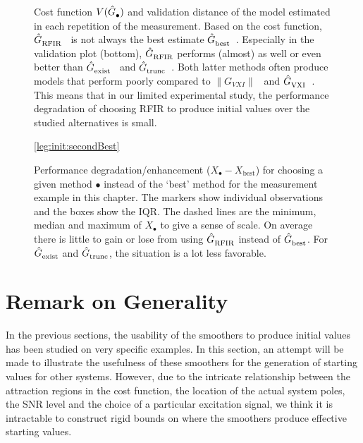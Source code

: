 \begin{figure}
  \centering
  \setlength{\figurewidth}{0.85\columnwidth}
  \setlength{\figureheight}{0.68\figurewidth}
  
  \caption[$\costFunc{\bullet}$ and $\validationDistance{\bullet}$ for each repeated measurement.]{Cost function $V(\hat{G}_{\mathrm{\bullet}}^{\mathrm{}})$ and validation distance of the model estimated in each repetition of the measurement.
  Based on the cost function, $\hat{G}_{\mathrm{RFIR}}^{\mathrm{}}$~ is not always the best estimate $\hat{G}_{\mathrm{best}}^{\mathrm{}}$~.
  Especially in the validation plot (bottom), $\hat{G}_{\mathrm{RFIR}}^{\mathrm{}}$ performs (almost) as well or even better than $\hat{G}_{\mathrm{exist}}^{\mathrm{}}$~ and $\hat{G}_{\mathrm{trunc}}^{\mathrm{}}$~.
  Both latter methods often produce models that perform poorly compared to $\| G_{VXI} \|$~ and $\hat{G}_{\mathrm{VXI}}^{\mathrm{}}$~.
  This means that in our limited experimental study, the performance degradation of choosing RFIR to produce initial values over the studied alternatives is small.}
  \label{fig:overview}
\end{figure}

\begin{figure}
  \centering
  \ref{leg:init:secondBest}
  \setlength{\figurewidth}{0.75\columnwidth}
  \setlength{\figureheight}{0.60\figurewidth}
  
  \caption[Performance degradation/enhancement for selecting the second best model.]{
  Performance degradation/enhancement ($X_{\bullet}-X_{\mathrm{best}}$) for choosing a given method $\bullet$ instead of the `best' method for the measurement example in this chapter.
  The markers show individual observations and the boxes show the \gls{IQR}.
  The dashed lines are the minimum, median and maximum of $X_{\bullet}$ to give a sense of scale.
  On average there is little to gain or lose from using $\hat{G}_{\mathrm{RFIR}}^{\mathrm{}}$ instead of $\hat{G}_{\mathrm{best}}^{\mathrm{}}$.
  For $\hat{G}_{\mathrm{exist}}^{\mathrm{}}$ and $\hat{G}_{\mathrm{trunc}}^{\mathrm{}}$, the situation is a lot less favorable.
  }
  \label{fig:init:histogramEnhancement}
\end{figure}

\section{Remark on Generality}
\label{se:Generality}
In the previous sections, the usability of the smoothers to produce initial values has been studied on very specific examples.
In this section, an attempt will be made to illustrate the usefulness of these smoothers for the generation of starting values for other systems.
However, due to the intricate relationship between the attraction regions in the cost function, the location of the actual system poles, the \gls{SNR} level and the choice of a particular excitation signal, we think it is intractable to construct rigid bounds on where the smoothers produce effective starting values.


